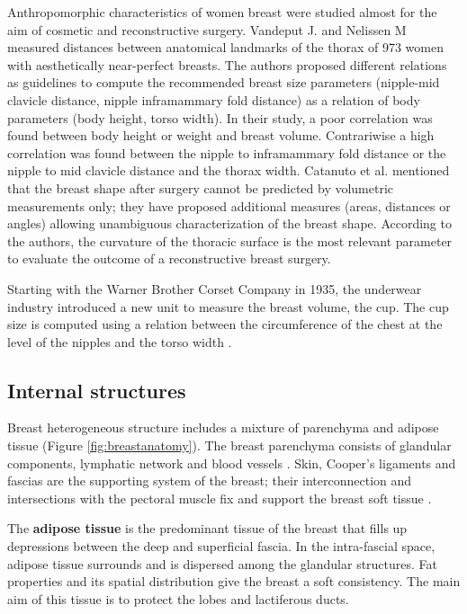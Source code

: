 Anthropomorphic characteristics of women breast were studied almost for the aim of cosmetic and reconstructive surgery. Vandeput J. and Nelissen M \citep{vandeput2002considerations} measured distances between anatomical landmarks of the thorax of 973 women with aesthetically near-perfect breasts. The authors proposed different relations as guidelines to compute the recommended breast size parameters (nipple-mid clavicle distance, nipple inframammary fold distance) as a relation of body parameters (body height, torso width). In their study, a poor correlation was found between body height or weight and breast volume. Contrariwise a high correlation was found between the nipple to  inframammary fold distance or the nipple to mid clavicle distance and the thorax width. Catanuto et al. \citep{catanuto2008experimental} mentioned that the breast shape after surgery cannot be predicted by volumetric measurements only; they have proposed additional measures (areas, distances or angles) allowing unambiguous characterization of the breast shape. According to the authors, the curvature of the thoracic surface is the most relevant parameter to evaluate the outcome of a reconstructive breast surgery.
 
Starting with the Warner Brother Corset Company in 1935, the underwear industry introduced a new unit to measure the breast volume, the cup. The cup size is computed using a relation between the circumference of the chest at the level of the nipples and the torso width \citep{pechter_new_1998}.

\subsection{Internal structures}\label{subsection:internalstructures}

Breast heterogeneous structure includes a mixture of parenchyma and adipose tissue (Figure \ref{fig:breastanatomy}). The breast parenchyma consists of glandular components, lymphatic network and blood vessels \citep{clemente2011anatomy}. Skin, Cooper's ligaments and fascias are the supporting system of the breast; their interconnection and intersections with the pectoral muscle fix and support the breast soft tissue \citep{mugea2014aesthetic}.

The \textbf{ adipose tissue} is the predominant tissue of the breast that fills up depressions between the deep and superficial fascia. In the intra-fascial space, adipose tissue surrounds and is dispersed among the glandular structures. Fat properties and its spatial distribution give the breast a soft consistency. The main aim of this tissue is to protect the lobes and lactiferous ducts.

